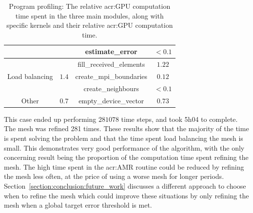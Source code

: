 \begin{table}[H]
\begin{tabular}{ c c c c }
                                            &                           & estimate\_error          & \(<0.1\)             \\
        \midrule
        \multirow{3}{*}{Load balancing}     & \multirow{3}{*}{\(1.4\)}  & fill\_received\_elements & \(1.22\)             \\
                                            &                           & create\_mpi\_boundaries  & \(0.12\)             \\
                                            &                           & create\_neighbours       & \(<0.1\)             \\
        \midrule
        \multirow{1}{*}{Other}              & \multirow{1}{*}{\(0.7\)}  & empty\_device\_vector    & \(0.73\)             \\
    \end{tabular}
    \caption{Program profiling: The relative \acrshort{acr:GPU} computation time spent in the three main modules, along with specific kernels and their relative \acrshort{acr:GPU} computation time.}\label{table:profiling}
\end{table}

This case ended up performing \(281078\) time steps, and took 5h04 to complete. The mesh was refined
281 times. These results show that the majority of the time is spent solving the problem and that
the time spent load balancing the mesh is small. This demonstrates very good performance of the
algorithm, with the only concerning result being the proportion of the computation time spent
refining the mesh. The high time spent in the \acrshort{acr:AMR} routine could be reduced by
refining the mesh less often, at the price of using a worse mesh for longer periods.
Section~\ref{section:conclusion:future_work} discusses a different approach to choose when to refine
the mesh which could improve these situations by only refining the mesh when a global target error
threshold is met.
